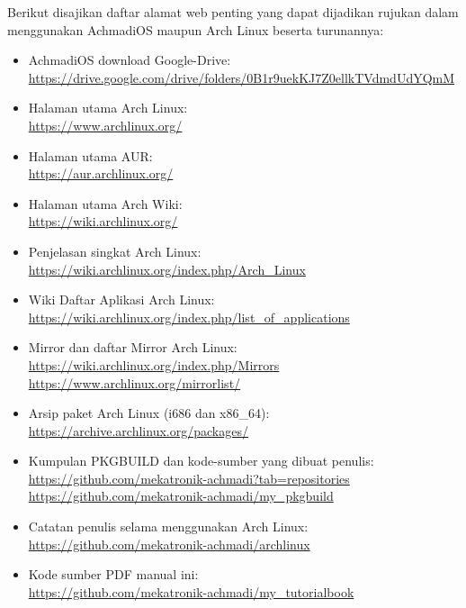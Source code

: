 \documentclass[12pt,]{article}
\begin{document}
	Berikut disajikan daftar alamat web penting yang dapat dijadikan rujukan dalam menggunakan AchmadiOS maupun Arch Linux beserta turunannya:
	\begin{itemize}
		\item AchmadiOS download Google-Drive:\\
		\url{https://drive.google.com/drive/folders/0B1r9uekKJ7Z0ellkTVdmdUdYQmM}
		
		\item Halaman utama Arch Linux:\\
		\url{https://www.archlinux.org/}
		
		\item Halaman utama AUR:\\
		\url{https://aur.archlinux.org/}
		
		\item Halaman utama Arch Wiki:\\
		\url{https://wiki.archlinux.org/}
		
		\item Penjelasan singkat Arch Linux:\\
		\url{https://wiki.archlinux.org/index.php/Arch_Linux}
		
		\item Wiki Daftar Aplikasi Arch Linux:\\
		\url{https://wiki.archlinux.org/index.php/list_of_applications}

		\item Mirror dan daftar Mirror Arch Linux:\\
		\url{https://wiki.archlinux.org/index.php/Mirrors}\\
		\url{https://www.archlinux.org/mirrorlist/}
		
		\item Arsip paket Arch Linux (i686 dan x86\_64):\\
		\url{https://archive.archlinux.org/packages/}
		
		\item Kumpulan PKGBUILD dan kode-sumber yang dibuat penulis:\\
		\url{https://github.com/mekatronik-achmadi?tab=repositories}\\
		\url{https://github.com/mekatronik-achmadi/my_pkgbuild}
		
		\item Catatan penulis selama menggunakan Arch Linux:\\
		\url{https://github.com/mekatronik-achmadi/archlinux}
		
		\item Kode sumber PDF manual ini:\\
		\url{https://github.com/mekatronik-achmadi/my_tutorialbook}
	\end{itemize}
	
\end{document}
